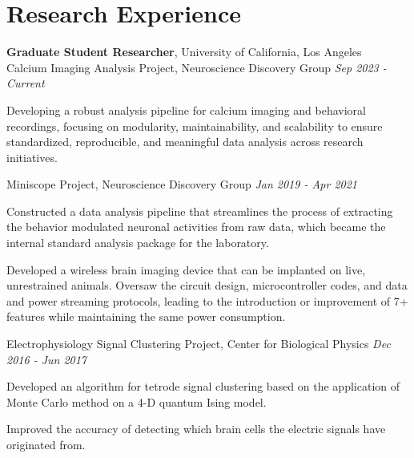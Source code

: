 \section{\mysidestyle Research Experience}
\textbf{Graduate Student Researcher}, University of California, Los Angeles\\
Calcium Imaging Analysis Project, Neuroscience Discovery Group \hfill \textsl{Sep 2023 - Current}

\begin{list2}
    \item {Developing a robust analysis pipeline for calcium imaging and behavioral recordings, focusing on modularity, maintainability, and scalability to ensure standardized, reproducible, and meaningful data analysis across research initiatives.}
\end{list2}

Miniscope Project, Neuroscience Discovery Group \hfill \textsl{Jan 2019 - Apr 2021}

\begin{list2}
    \item {Constructed a data analysis pipeline that streamlines the process of extracting the behavior modulated neuronal activities from raw data, which became the internal standard analysis package for the laboratory.}
    \item {Developed a wireless brain imaging device that can be implanted on live, unrestrained animals. Oversaw the circuit design, microcontroller codes, and data and power streaming protocols, leading to the introduction or improvement of 7+ features while maintaining the same power consumption.}
\end{list2}



Electrophysiology Signal Clustering Project, Center for Biological Physics \hfill \textsl{Dec 2016 - Jun 2017}

\begin{list2}
    \item {Developed an algorithm for tetrode signal clustering based on the application of Monte Carlo method on a 4-D quantum Ising model.}
    \item {Improved the accuracy of detecting which brain cells the electric signals have originated from.}
\end{list2}

